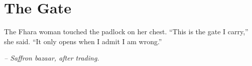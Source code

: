 \chapter*{The Gate}

The Fhara woman touched the padlock on her chest. ``This is the gate I carry,'' she said. ``It only opens when I admit I am wrong.''

\smallskip

\noindent \textit{-- Saffron bazaar, after trading.}

